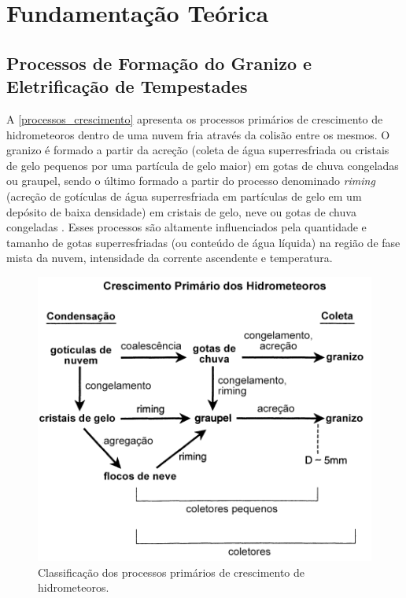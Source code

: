 \chapter{Fundamentação Teórica}\label{teoria}

\section{Processos de Formação do Granizo e Eletrificação de Tempestades}\label{granizo_eletrificacao}

A \autoref{processos_crescimento} apresenta os processos primários de crescimento de hidrometeoros dentro de uma nuvem fria através da colisão entre os mesmos. O granizo é formado a partir da acreção (coleta de água superresfriada ou cristais de gelo pequenos por uma partícula de gelo maior) em gotas de chuva congeladas ou graupel, sendo o último formado a partir do processo denominado \textit{riming} (acreção de gotículas de água superresfriada em partículas de gelo em um depósito de baixa densidade) em cristais de gelo, neve ou gotas de chuva congeladas \cite{Reinking1975}. Esses processos são altamente influenciados pela quantidade e tamanho de gotas superresfriadas (ou conteúdo de água líquida) na região de fase mista da nuvem, intensidade da corrente ascendente e temperatura.

\begin{figure}[htb]
	\begin{center}
		\caption{Classificação dos processos primários de crescimento de hidrometeoros.} 
		\label{processos_crescimento}
		\includegraphics[width=0.7\columnwidth]{figs/growth_knight_ptbr.png}
	\end{center}
\end{figure}

